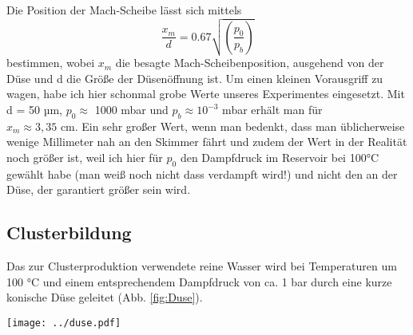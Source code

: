 Die Position der Mach-Scheibe lässt sich mittels
\begin{equation}
\frac{x_m}{d}=0.67 \sqrt{\left( \frac{p_0}{p_b}\right)}
\end{equation}
%
bestimmen, wobei $x_m$ die besagte Mach-Scheibenposition, ausgehend von der Düse und d die Größe der Düsenöffnung ist.
Um einen kleinen Vorausgriff zu wagen, habe ich hier schonmal grobe Werte unseres Experimentes eingesetzt. Mit d = 50 µm, $p_0 \approx$ 1000 mbar und $p_b \approx 10^{-3}$  mbar erhält man für\\ $x_m \approx 3,35$ cm. Ein sehr großer Wert, wenn man bedenkt, dass man üblicherweise wenige Millimeter nah an den Skimmer fährt und zudem der Wert in der Realität noch größer ist, weil ich hier für $p_0$ den Dampfdruck im Reservoir bei 100°C gewählt habe (man weiß noch nicht dass verdampft wird!) und nicht den an der Düse, der garantiert größer sein wird.



\subsection{Clusterbildung}

Das zur Clusterproduktion verwendete reine Wasser wird bei Temperaturen um 100 °C und einem entsprechendem Dampfdruck von ca. 1 bar durch eine kurze konische Düse geleitet (Abb. \ref{fig:Duse}).
%
\begin{center}
\begin{minipage}{\linewidth}
\centering
\texttt{[image: ../duse.pdf]}%
 \label{fig:Duse}
\end{minipage} 
\end{center} 

